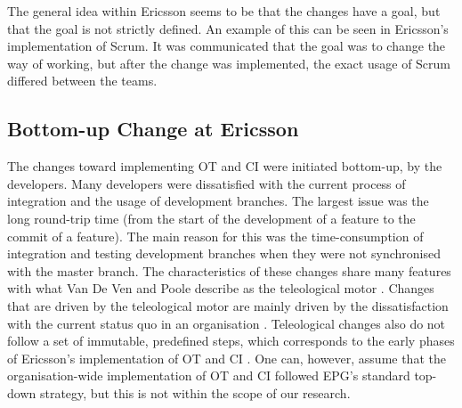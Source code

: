 \documentclass[final_report_innit.tex]{subfiles}
\begin{document}
The general idea within Ericsson seems to be that the changes have a goal, but that the goal is not strictly defined. An example of this can be seen in Ericsson’s implementation of Scrum. It was communicated that the goal was to change the way of working, but after the change was implemented, the exact usage of Scrum differed between the teams. 

\subsection{Bottom-up Change at Ericsson}
The changes toward implementing OT and CI were initiated bottom-up, by the developers. Many developers were dissatisfied with the current process of integration and the usage of development branches. The largest issue was the long round-trip time (from the start of the development of a feature to the commit of a feature). The main reason for this was the time-consumption of integration and testing development branches when they were not synchronised with the master branch. The characteristics of these changes share many features with what Van De Ven and Poole describe as the teleological motor \cite{van1995explaining}. Changes that are driven by the teleological motor are mainly driven by the dissatisfaction with the current status quo in an organisation \cite{van1995explaining}. Teleological changes also do not follow a set of immutable, predefined steps, which corresponds to the early phases of Ericsson’s implementation of OT and CI \cite{van1995explaining}. One can, however, assume that the organisation-wide implementation of OT and CI followed EPG’s standard top-down strategy, but this is not within the scope of our research.
\end{document}
